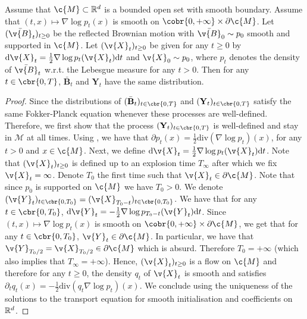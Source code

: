 \begin{proposition}
	Assume that $\c{M} \subset \R^d$ is a bounded open set with smooth boundary.
	Assume that $(t,x) \mapsto \nabla \log p_t(x)$ is smooth on $\cobr{0,+\infty} \times \partial \c{M}$.
	Let $(\bar{\v{B}}_t)_{t \geq 0}$ be the reflected Brownian motion with $\bar{\v{B}}_0 \sim p_0$ smooth and supported in $\c{M}$.
	Let $(\v{X}_t)_{t \geq 0}$ be given for any $t \geq 0$ by $\mathrm{d} \v{X}_t = \tfrac{1}{2} \nabla \log p_t(\v{X}_t) \mathrm{d} t$ and $\v{X}_0 \sim p_0$, where $p_t$ denotes the density of $\bar{\v{B}}_t$ w.r.t.
	the Lebesgue measure for any $t > 0$.
	Then for any $t \in \cbr{0,T}$, $\bar{\mathbf{B}}_t$ and $\mathbf{Y}_t$ have the same distribution.
\end{proposition}

\begin{proof}
	Since the distributions of $(\bar{\mathbf{B}}_t)_{t \in \cbr{0,T}}$ and $(\mathbf{Y}_t)_{t \in \cbr{0,T}}$ satisfy the same Fokker-Planck equation whenever these processes are well-defined.
	Therefore, we first show that the process $(\mathbf{Y}_t)_{t \in \cbr{0,T}}$ is well-defined and stay in $\mathcal{M}$ at all times.
	Using \cite[Theorem 2.2]{burdzy2004heat}, we have that $\partial p_t(x) = \tfrac{1}{2} \mathrm{div}(\nabla \log p_t)(x)$, for any $t > 0$ and $x \in \c{M}$.
	Next, we define $\mathrm{d} \v{X}_t = \tfrac{1}{2} \nabla \log p_t(\v{X}_t) \mathrm{d} t$.
	Note that $(\v{X}_t)_{t \geq 0}$ is defined up to an explosion time $T_\infty$ after which we fix $\v{X}_t = \infty$.
	Denote $T_0$ the first time such that $\v{X}_t \in \partial \c{M}$.
	Note that since $p_0$ is supported on $\c{M}$ we have $T_0 > 0$.
	We denote $(\v{Y}_t)_{t \in \cbr{0,T_0}} = (\v{X}_{T_0-t})_{t \in \cbr{0,T_0}}$.
	We have that for any $t \in \cbr{0,T_0}$, $\mathrm{d} \v{Y}_t = -\tfrac{1}{2} \nabla \log p_{T_0-t}(\v{Y}_t) \mathrm{d} t$.
	Since $(t,x) \mapsto \nabla \log p_t(x)$ is smooth on $\cobr{0,+\infty} \times \partial \c{M}$, we get that for any $t \in \cbr{0,T_0}$, $\v{Y}_t \in \partial \c{M}$.
	In particular, we have that $\v{Y}_{T_0/2} = \v{X}_{T_0/2} \in \partial \c{M}$ which is absurd.
	Therefore $T_0 = +\infty$ (which also implies that $T_\infty = +\infty$).
	Hence, $(\v{X}_t)_{t \geq 0}$ is a flow on $\c{M}$ and therefore for any $t \geq 0$, the density $q_t$ of $\v{X}_t$ is smooth and satisfies $\partial_t q_t(x) = -\tfrac{1}{2} \mathrm{div}(q_t \nabla \log p_t )(x)$.
	We conclude using the uniqueness of the solutions to the transport equation for smooth initialisation and coefficients on $\mathbb{R}^d$.
\end{proof}

